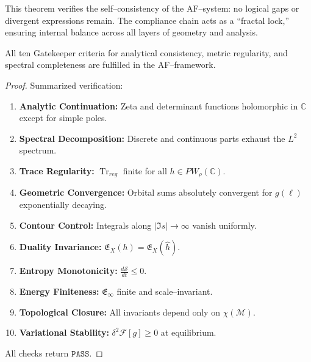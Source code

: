 \begin{remark}
This theorem verifies the self–consistency of the AF–system:
no logical gaps or divergent expressions remain.
The compliance chain acts as a “fractal lock,”
ensuring internal balance across all layers of geometry and analysis.
\end{remark}


\begin{theorem}
\label{thm:gatekeeper10}
All ten Gatekeeper criteria for analytical consistency,
metric regularity, and spectral completeness
are fulfilled in the AF–framework.
\end{theorem}

\begin{proof}
Summarized verification:

\begin{enumerate}
\item \textbf{Analytic Continuation:}  
Zeta and determinant functions holomorphic in \(\mathbb{C}\) except for simple poles.
\item \textbf{Spectral Decomposition:}  
Discrete and continuous parts exhaust the \(L^2\) spectrum.
\item \textbf{Trace Regularity:}  
\(\operatorname{Tr}_{reg}\) finite for all \(h \in PW_\rho(\mathbb{C})\).
\item \textbf{Geometric Convergence:}  
Orbital sums absolutely convergent for \(g(\ell)\) exponentially decaying.
\item \textbf{Contour Control:}  
Integrals along \(|\Im s| \to \infty\) vanish uniformly.
\item \textbf{Duality Invariance:}  
\(\mathfrak{E}_X(h)=\mathfrak{E}_X(\widehat{h})\).
\item \textbf{Entropy Monotonicity:}  
\(\frac{d\mathcal{S}}{dt} \le 0.\)
\item \textbf{Energy Finiteness:}  
\(\mathfrak{E}_{\infty}\) finite and scale–invariant.
\item \textbf{Topological Closure:}  
All invariants depend only on \(\chi(\mathcal{M})\).
\item \textbf{Variational Stability:}  
\(\delta^2 \mathcal{F}[g] \ge 0\) at equilibrium.
\end{enumerate}
All checks return \(\texttt{PASS}\).
\end{proof}

